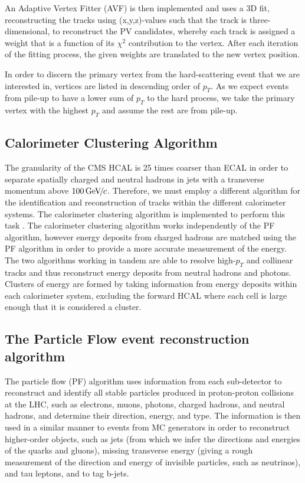 An Adaptive Vertex Fitter (AVF) \cite{1742-6596-110-9-092009} is then implemented and uses a 3D fit, reconstructing the tracks using (x,y,z)-values such that the track is three-dimensional, to reconstruct the PV candidates, whereby each track is assigned a weight that is a function of its $\chi^2$ contribution to the vertex. After each iteration of the fitting process, the given weights are translated to the new vertex position. 

In order to discern the primary vertex from the hard-scattering event that we are interested in, vertices are listed in descending order of $p_T$. As we expect events from pile-up to have a lower sum of $p_T$ to the hard process, we take the primary vertex with the highest $p_T$ and assume the rest are from pile-up.  

\subsection{Calorimeter Clustering Algorithm} \label{subsec-CalorimeterClusteringAlgorithm}

The granularity of the CMS HCAL is 25 times coarser than ECAL in order to separate spatially charged and neutral hadrons in jets with a transverse momentum above $100 {\,\text{Ge\hspace{-.08em}V\hspace{-0.16em}/\hspace{-0.08em}}c}$. Therefore, we must employ a different algorithm for the identification and reconstruction of tracks within the different calorimeter systems. The calorimeter clustering algorithm is implemented to perform this task \cite{CMS-PAS-PFT-09-001}. The calorimeter clustering algorithm works independently of the PF algorithm, however energy deposits from charged hadrons are matched using the PF algorithm in order to provide a more accurate measurement of the energy. The two algorithms working in tandem are able to resolve high-$p_T$ and collinear tracks and thus reconstruct energy deposits from neutral hadrons and photons. Clusters of energy are formed by taking information from energy deposits within each calorimeter system, excluding the forward HCAL where each cell is large enough that it is considered a cluster.


\subsection{The Particle Flow event reconstruction algorithm} \label{subsec-PFAlgorithm}

The particle flow (PF) algorithm \cite{CMS-PAS-PFT-09-001} uses information from each sub-detector to reconstruct and identify all stable particles produced in proton-proton collisions at the LHC, such as electrons, muons, photons, charged hadrons, and neutral hadrons, and determine their direction, energy, and type. The information is then used in a similar manner to events from MC generators in order to reconstruct higher-order objects, such as jets (from which we infer the directions and energies of the quarks and gluons), missing transverse energy (giving a rough measurement of the direction and energy of invisible particles, such as neutrinos), and tau leptons, and to tag b-jets.  


